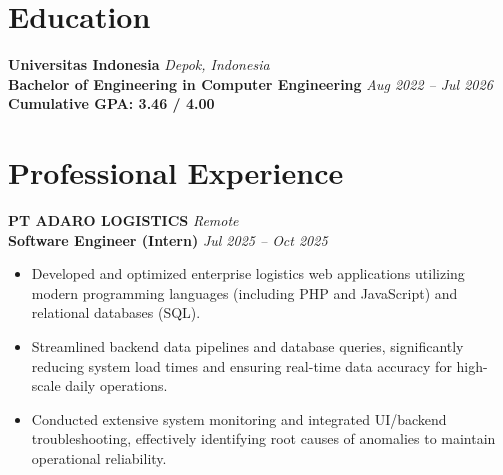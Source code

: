 \documentclass[a4paper,11pt]{article}
\begin{document}
\vspace{0.4em}

\section*{Education}
\noindent
\textbf{Universitas Indonesia} \hfill \textit{Depok, Indonesia}\\
\textbf{Bachelor of Engineering in Computer Engineering} \hfill \textit{Aug 2022 -- Jul 2026}\\
\textbf{Cumulative GPA: 3.46 / 4.00}

\vspace{0.4em}

\section*{Professional Experience}
\noindent
\textbf{PT ADARO LOGISTICS} \hfill \textit{Remote}\\
\textbf{Software Engineer (Intern)} \hfill \textit{Jul 2025 -- Oct 2025}
\begin{itemize}[leftmargin=1.5em, itemsep=0.25em]
    \item \justifying Developed and optimized enterprise logistics web applications utilizing modern programming languages (including PHP and JavaScript) and relational databases (SQL).
    \item \justifying Streamlined backend data pipelines and database queries, significantly reducing system load times and ensuring real-time data accuracy for high-scale daily operations.
    \item \justifying Conducted extensive system monitoring and integrated UI/backend troubleshooting, effectively identifying root causes of anomalies to maintain operational reliability.
\end{itemize}

\vspace{0.4em}

\newpage

\end{document}
